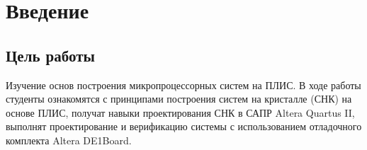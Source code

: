\section{Введение}

\subsection{Цель работы}
Изучение основ построения микропроцессорных систем на ПЛИС. В ходе работы студенты
ознакомятся с принципами построения систем на кристалле (СНК) на основе ПЛИС, получат
навыки проектирования СНК в САПР Altera Quartus II, выполнят проектирование и
верификацию системы с использованием отладочного комплекта Altera DE1Board.

